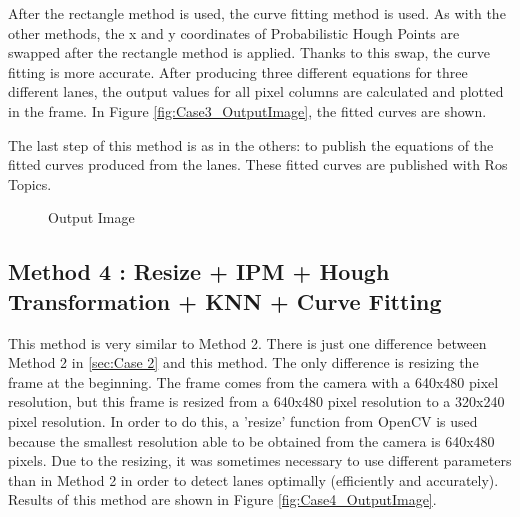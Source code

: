 After the rectangle method is used, the curve fitting method is used. As with the other methods, the x and y coordinates of Probabilistic Hough Points are swapped after the rectangle method is applied. Thanks to this swap, the curve fitting is more accurate. After producing three different equations for three different lanes, the output values for all pixel columns are calculated and plotted in the frame. In Figure \ref{fig:Case3_OutputImage}, the fitted curves are shown.

The last step of this method is as in the others: to publish the equations of the fitted curves produced from the lanes. These fitted curves are published with Ros Topics.

\begin{figure}[H]
  \centering
  \caption{Output Image}
\end{figure}

\subsection{Method 4 : Resize + IPM + Hough Transformation + KNN + Curve Fitting}\label{sec:Case 4}

This method is very similar to Method 2. There is just one difference between Method 2 in \ref{sec:Case 2} and this method. The only difference is resizing the frame at the beginning. The frame comes from the camera with a 640x480 pixel resolution, but this frame is resized from a 640x480 pixel resolution to a 320x240 pixel resolution. In order to do this, a 'resize' function from OpenCV is used because the smallest resolution able to be obtained from the camera is 640x480 pixels. Due to the resizing, it was sometimes necessary to use different parameters than in Method 2 in order to detect lanes optimally (efficiently and accurately). Results of this method are shown in Figure \ref{fig:Case4_OutputImage}.

